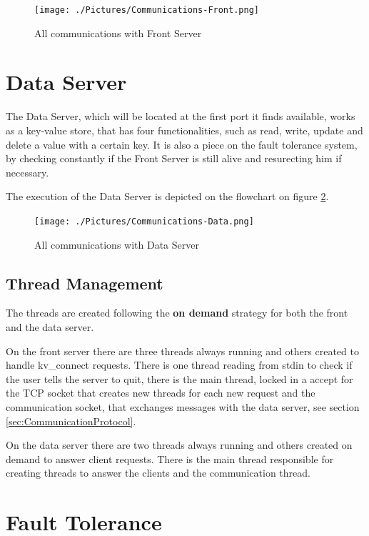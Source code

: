\documentclass[12pt]{article} %
\begin{document}
\begin{figure}[ht]
\centering
\texttt{[image: ./Pictures/Communications-Front.png]}
\caption{All communications with Front Server}\label{fig:CommunicationsFront}
\end{figure}

\section{Data Server}
\label{sec:DataServer}

The Data Server, which will be located at the first port it finds available, 
works as a key-value store, that has four functionalities, such as read, 
write, update and delete a value with a certain key. It is also a piece on the fault tolerance system,
by checking constantly if the Front Server is still alive and resurecting him if necessary.

The execution of the Data Server is depicted on the flowchart on figure \ref{fig:CommunicationsData}.

\begin{figure}[ht]
\centering
\texttt{[image: ./Pictures/Communications-Data.png]}
\caption{All communications with Data Server}\label{fig:CommunicationsData}
\end{figure}

\subsection{Thread Management}
\label{sub:ThreadManagement}

The threads are created following the \textbf{on demand} strategy for both the front and 
the data server.

On the front server there are three threads always running and others created 
to handle kv\_connect requests. There is one thread reading from stdin to check if 
the user tells the server to quit, there is the main thread, locked in a accept for the 
TCP socket that creates new threads for each new request and the communication 
socket, that exchanges messages with the data server, see section \ref{sec:CommunicationProtocol}.

On the data server there are two threads always running and others created 
on demand to answer client requests. There is the main thread responsible for 
creating threads to answer the clients and the communication thread.

\section{Fault Tolerance}
\label{sec:FaultTolerance}
\end{document}
